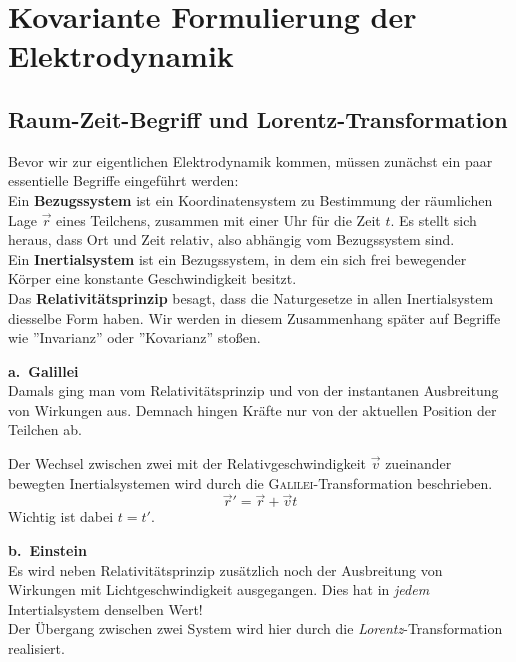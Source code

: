 \chapter{Kovariante Formulierung der Elektrodynamik}

\section{Raum-Zeit-Begriff und Lorentz-Transformation}

Bevor wir zur eigentlichen Elektrodynamik kommen, müssen zunächst ein paar essentielle Begriffe eingeführt werden:\\

Ein \textbf{Bezugssystem} ist ein Koordinatensystem zu Bestimmung der räumlichen Lage $\vec{r}$ eines Teilchens, zusammen mit einer Uhr für die Zeit $t$. Es stellt sich heraus, dass Ort und Zeit relativ, also abhängig vom Bezugssystem sind.\\

Ein \textbf{Inertialsystem} ist ein Bezugssystem, in dem ein sich frei bewegender Körper eine konstante Geschwindigkeit besitzt.\\

Das \textbf{Relativitätsprinzip} besagt, dass die Naturgesetze in allen Inertialsystem diesselbe Form haben. Wir werden in diesem Zusammenhang später auf Begriffe wie ''Invarianz'' oder ''Kovarianz'' stoßen.\\ \linebreak

\textbf{a.\ Galillei}\\

Damals ging man vom Relativitätsprinzip und von der instantanen Ausbreitung von Wirkungen aus. Demnach hingen Kräfte nur von der aktuellen Position der Teilchen ab.\\
\newpage

Der Wechsel zwischen zwei mit der Relativgeschwindigkeit $\vec{v}$ zueinander bewegten Inertialsystemen wird durch die \textsc{Galilei}-Transformation beschrieben. 
\begin{equation*}
\vec{r}'=\vec{r}+\vec{v}t
\end{equation*}
Wichtig ist dabei $t=t'$.\\ \linebreak

\textbf{b.\ Einstein}\\

Es wird neben Relativitätsprinzip zusätzlich noch der Ausbreitung von Wirkungen mit Lichtgeschwindigkeit ausgegangen. Dies hat in \emph{jedem} Intertialsystem denselben Wert! \\
Der Übergang zwischen zwei System wird hier durch die \emph{Lorentz}-Transformation realisiert.\\ \linebreak

